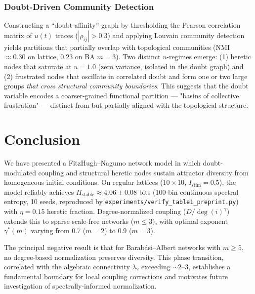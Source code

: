 \documentclass[11pt]{article}
\begin{document}
\subsubsection*{Doubt-Driven Community Detection}

Constructing a ``doubt-affinity'' graph by thresholding the Pearson correlation matrix of $u(t)$ traces ($|\rho_{ij}| > 0.3$) and applying Louvain community detection yields partitions that partially overlap with topological communities (NMI $\approx 0.30$ on lattice, $0.23$ on BA $m=3$). Two distinct $u$-regimes emerge: (1) heretic nodes that saturate at $u=1.0$ (zero variance, isolated in the doubt graph) and (2) frustrated nodes that oscillate in correlated doubt and form one or two large groups \emph{that cross structural community boundaries}. This suggests that the doubt variable encodes a coarser-grained functional partition — "basins of collective frustration" — distinct from but partially aligned with the topological structure.

\section{Conclusion}

We have presented a FitzHugh--Nagumo network model in which doubt-modulated coupling and structural heretic nodes sustain attractor diversity from homogeneous initial conditions. On regular lattices ($10\times10$, $I_{\text{stim}}=0.5$), the model reliably achieves $H_{\text{stable}} \approx 4.06 \pm 0.08$ bits (100-bin continuous spectral entropy, 10 seeds, reproduced by \texttt{experiments/verify\_table1\_preprint.py}) with $\eta = 0.15$ heretic fraction. Degree-normalized coupling ($D/\deg(i)^\gamma$) extends this to sparse scale-free networks ($m \leq 3$), with optimal exponent $\gamma^*(m)$ varying from 0.7 ($m = 2$) to 0.9 ($m = 3$).

The principal negative result is that for Barab\'asi--Albert networks with $m \geq 5$, no degree-based normalization preserves diversity. This phase transition, correlated with the algebraic connectivity $\lambda_2$ exceeding $\sim$2--3, establishes a fundamental boundary for local coupling corrections and motivates future investigation of spectrally-informed normalization.

\end{document}
